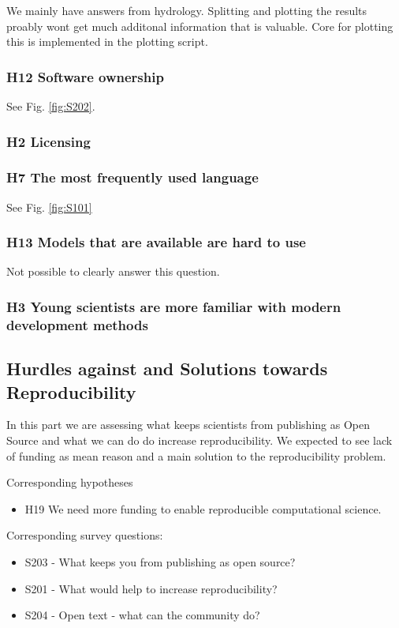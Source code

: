 \documentclass{article}
\begin{document}
We mainly have answers from hydrology. Splitting and plotting the results proably wont get much additonal information that is valuable. Core for plotting this is implemented in the plotting script.

\subsubsection{H12 Software ownership}
See Fig. \ref{fig:S202}.

\subsubsection{H2 Licensing}


\subsubsection{H7 The most frequently used language}
See Fig. \ref{fig:S101}

\subsubsection{H13 Models that are available are hard to use}
Not possible to clearly answer this question.

\subsubsection{H3 Young scientists are more familiar with modern development methods}


\newpage

\subsection{Hurdles against and Solutions towards Reproducibility}
In this part we are assessing what keeps scientists from publishing as Open Source and what we can do do increase reproducibility.
We expected to see lack of funding as mean reason and a main solution to the reproducibility problem.


Corresponding hypotheses
\begin{itemize}	
	\item H19 We need more funding to enable reproducible computational science.
\end{itemize}

Corresponding survey questions:
\begin{itemize}
	\item S203 - What keeps you from publishing as open source?
	\item S201 - What would help to increase reproducibility?
	\item S204 - Open text - what can the community do?
\end{itemize}
\end{document}

